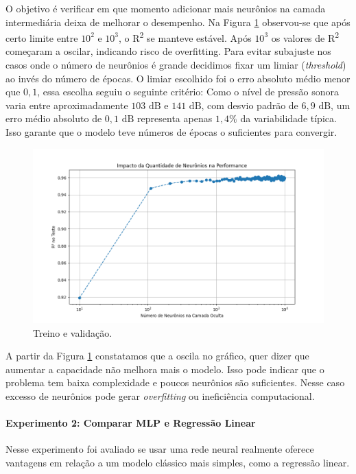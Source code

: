 \documentclass[12pt,a4paper,oneside]{report}
\begin{document}
	O objetivo é verificar em que momento adicionar mais neurônios na camada intermediária deixa de melhorar o desempenho. Na Figura \ref{fig:t1_impacto_neuronio_performace} observou-se que após certo limite entre $10^{2}$ e $10^{3}$, o R\textsuperscript{2} se manteve estável.%
	Após $10^{3}$ os valores de R\textsuperscript{2} começaram a oscilar, indicando risco de overfitting. Para evitar subajuste nos casos onde o número de neurônios é grande decidimos fixar um limiar (\textit{threshold}) ao invés do número de épocas. O limiar escolhido foi o erro absoluto médio menor que $0,1$, essa escolha seguiu o seguinte critério: Como o nível de pressão sonora varia entre aproximadamente $103 \text{ dB}$ e $141 \text{ dB}$, com desvio padrão de $6,9 \text{ dB}$, um erro médio absoluto de $0,1 \text{ dB}$ representa apenas $1,4\%$ da variabilidade típica. Isso garante que o modelo teve números de épocas o suficientes para convergir.
	\begin{figure}[h!]
		\centering
		\includegraphics[width=0.7\linewidth]{img/t1_impacto_neuronio_performace}
		\caption{Treino e validação.}
		\label{fig:t1_impacto_neuronio_performace}
	\end{figure}
	
	A partir da Figura \ref{fig:t1_impacto_neuronio_performace} constatamos que a oscila no gráfico, quer dizer que aumentar a capacidade não melhora mais o modelo. Isso pode indicar que o problema tem baixa complexidade e poucos neurônios são suficientes. Nesse caso excesso de neurônios pode gerar \textit{overfitting} ou ineficiência computacional.
	
	\paragraph{Experimento 2: Comparar MLP e Regress\~ao Linear}
	
	Nesse experimento foi avaliado se usar uma rede neural realmente oferece vantagens em relação a um modelo clássico mais simples, como a regressão linear.
	
\end{document}
